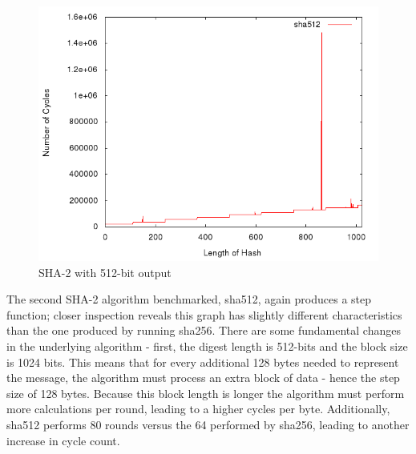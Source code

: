 \documentclass[10pt,a4paper]{article}
\begin{document}
    \begin{figure}[H]
        \begin{center}
            \includegraphics[scale=0.5]{images/sha512.png} 
            \caption{SHA-2 with 512-bit output}
        \end{center}
    \end{figure}

The second SHA-2 algorithm benchmarked, sha512, again produces a step function; closer inspection reveals this graph has slightly different characteristics than the one produced by running sha256.  There are some fundamental changes in the underlying algorithm - first, the digest length is 512-bits and the block size is 1024 bits.  This means that for every additional 128 bytes needed to represent the message, the algorithm must process an extra block of data - hence the step size of 128 bytes.  Because this block length is longer the algorithm must perform more calculations per round, leading to a higher cycles per byte.  Additionally, sha512 performs 80 rounds versus the 64 performed by sha256, leading to another increase in cycle count.
\end{document}
